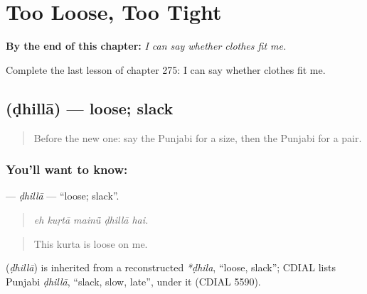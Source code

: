 
\chapter{Too Loose, Too Tight}
\label{ch:pa-a2-too-loose-too-tight}

\begin{chapteropening}
\textbf{By the end of this chapter:} \emph{I can say whether clothes fit me.}

Complete the last lesson of chapter 275: I can say whether clothes fit me.
\end{chapteropening}

\section[\texorpdfstring{\pa{ਢਿੱਲਾ} (ḍhillā)}{ਢਿੱਲਾ (ḍhillā)}]{ (ḍhillā) — loose; slack}

\label{lesson:PA-C275-dhilla}



\begin{quote}
Before the new one: say the Punjabi for a size, then the Punjabi for a pair.
\end{quote}

\subsection*{You'll want to know: }
\textbf{} — \emph{ḍhillā} — \textquotedblleft{}loose; slack\textquotedblright{}.

\begin{quote}
    
\end{quote}

\begin{quote}
\emph{eh kuṛtā mainū̃ ḍhillā hai.}
\end{quote}

\begin{quote}
This kurta is loose on me.
\end{quote}

\begin{cousinweb}
\textbf{} (\emph{ḍhillā}) is inherited from a reconstructed \emph{*ḍhila}, \textquotedblleft{}loose, slack\textquotedblright{}; CDIAL lists Punjabi \emph{ḍhillā}, \textquotedblleft{}slack, slow, late\textquotedblright{}, under it (CDIAL 5590).
\end{cousinweb}

